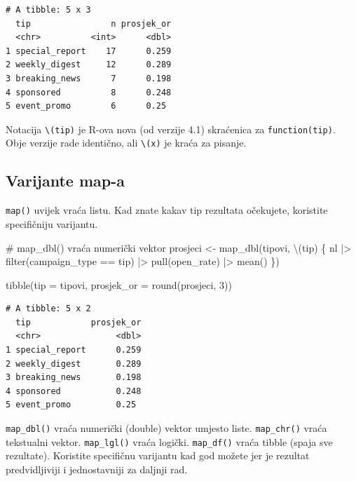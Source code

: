 \documentclass[
  croatian,
  letterpaper,
  DIV=11,
  numbers=noendperiod]{scrartcl}
\newenvironment{Shaded}{\begin{snugshade}}{\end{snugshade}}
\newcommand{\AttributeTok}[1]{\textcolor[rgb]{0.40,0.45,0.13}{#1}}
\newcommand{\CommentTok}[1]{\textcolor[rgb]{0.37,0.37,0.37}{#1}}
\newcommand{\DecValTok}[1]{\textcolor[rgb]{0.68,0.00,0.00}{#1}}
\newcommand{\FunctionTok}[1]{\textcolor[rgb]{0.28,0.35,0.67}{#1}}
\newcommand{\NormalTok}[1]{\textcolor[rgb]{0.00,0.23,0.31}{#1}}
\newcommand{\OtherTok}[1]{\textcolor[rgb]{0.00,0.23,0.31}{#1}}
\newcommand{\SpecialCharTok}[1]{\textcolor[rgb]{0.37,0.37,0.37}{#1}}
\begin{document}
\begin{verbatim}
# A tibble: 5 x 3
  tip                n prosjek_or
  <chr>          <int>      <dbl>
1 special_report    17      0.259
2 weekly_digest     12      0.289
3 breaking_news      7      0.198
4 sponsored          8      0.248
5 event_promo        6      0.25 
\end{verbatim}

Notacija \texttt{\textbackslash{}(tip)} je R-ova nova (od verzije 4.1)
skraćenica za \texttt{function(tip)}. Obje verzije rade identično, ali
\texttt{\textbackslash{}(x)} je kraća za pisanje.

\subsection{Varijante map-a}\label{varijante-map-a}

\texttt{map()} uvijek vraća listu. Kad znate kakav tip rezultata
očekujete, koristite specifičniju varijantu.

\begin{Shaded}
\begin{Highlighting}[]
\CommentTok{\# map\_dbl() vraća numerički vektor}
\NormalTok{prosjeci }\OtherTok{\textless{}{-}} \FunctionTok{map\_dbl}\NormalTok{(tipovi, \textbackslash{}(tip) \{}
\NormalTok{  nl }\SpecialCharTok{|\textgreater{}}
    \FunctionTok{filter}\NormalTok{(campaign\_type }\SpecialCharTok{==}\NormalTok{ tip) }\SpecialCharTok{|\textgreater{}}
    \FunctionTok{pull}\NormalTok{(open\_rate) }\SpecialCharTok{|\textgreater{}}
    \FunctionTok{mean}\NormalTok{()}
\NormalTok{\})}

\FunctionTok{tibble}\NormalTok{(}\AttributeTok{tip =}\NormalTok{ tipovi, }\AttributeTok{prosjek\_or =} \FunctionTok{round}\NormalTok{(prosjeci, }\DecValTok{3}\NormalTok{))}
\end{Highlighting}
\end{Shaded}

\begin{verbatim}
# A tibble: 5 x 2
  tip            prosjek_or
  <chr>               <dbl>
1 special_report      0.259
2 weekly_digest       0.289
3 breaking_news       0.198
4 sponsored           0.248
5 event_promo         0.25 
\end{verbatim}

\texttt{map\_dbl()} vraća numerički (double) vektor umjesto liste.
\texttt{map\_chr()} vraća tekstualni vektor. \texttt{map\_lgl()} vraća
logički. \texttt{map\_df()} vraća tibble (spaja sve rezultate).
Koristite specifičnu varijantu kad god možete jer je rezultat
predvidljiviji i jednostavniji za daljnji rad.
\end{document}
